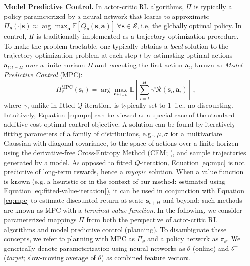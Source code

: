 \documentclass{article}
\begin{document}
\textbf{Model Predictive Control.} In actor-critic RL algorithms, $\Pi$ is typically a policy parameterized by a neural network that learns to approximate $\Pi_{\theta}(\cdot | \mathbf{s}) \approx \arg\max_{\mathbf{a}} \mathbb{E}[ Q_{\theta}(\mathbf{s}, \mathbf{a}) ]~\forall \mathbf{s} \in \mathcal{S}$, i.e, the globally optimal policy. In control, $\Pi$ is traditionally implemented as a trajectory optimization procedure. To make the problem tractable, one typically obtains a \textit{local} solution to the trajectory optimization problem at each step $t$ by estimating optimal actions $\mathbf{a}_{t:t+H}$ over a finite horizon $H$ and executing the first action $\mathbf{a}_{t}$, known as \textit{Model Predictive Control} (MPC):
\begin{equation}
    \label{eq:mpc}
    \Pi^{\text{MPC}}_{\theta}(\mathbf{s}_{t}) = \arg\max_{\mathbf{a}_{t:t+H}} \mathbb{E}\left[ \sum_{i=t}^{H} \gamma^{i} \mathcal{R}(\mathbf{s}_{i}, \mathbf{a}_{i}) \right]\,,
\end{equation}
where $\gamma$, unlike in fitted $Q$-iteration, is typically set to 1, i.e., no discounting. Intuitively, Equation \ref{eq:mpc} can be viewed as a special case of the standard additive-cost optimal control objective. A solution can be found by iteratively fitting parameters of a family of distributions, e.g., $\mu, \sigma$ for a multivariate Gaussian with diagonal covariance, to the space of actions over a finite horizon using the derivative-free Cross-Entropy Method (CEM; \citet{Rubinstein1997OptimizationOC}), and sample trajectories generated by a model. As opposed to fitted $Q$-iteration, Equation \ref{eq:mpc} is not predictive of long-term rewards, hence a \textit{myopic} solution. When a value function is known (e.g. a heuristic or in the context of our method: estimated using Equation \ref{eq:fitted-value-iteration}), it can be used in conjunction with Equation \ref{eq:mpc} to estimate discounted return at state $\mathbf{s}_{t+H}$ and beyond; such methods are known as MPC with a \textit{terminal value function}. In the following, we consider parameterized mappings $\Pi$ from both the perspective of actor-critic RL algorithms and model predictive control (planning). To disambiguate these concepts, we refer to planning with MPC as $\Pi_{\theta}$ and a policy network as $\pi_{\theta}$. We generically denote parameterization using neural networks as $\theta$ (online) and $\theta^{-}$ (\textit{target}; slow-moving average of $\theta$) as combined feature vectors.
\end{document}
